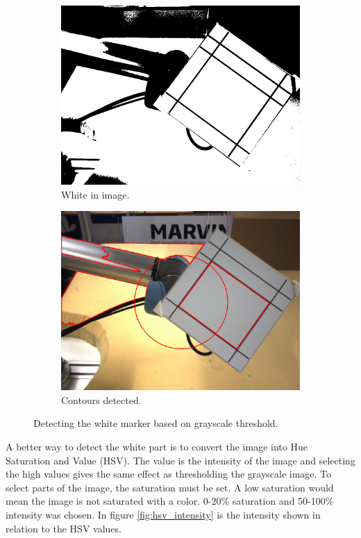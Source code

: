 \begin{figure}
 \centering
 \begin{subfigure}{0.49\linewidth}
 \includegraphics[width=\linewidth]{graphics/threshold_white}
 \caption{White in image.}
 \end{subfigure}
 \begin{subfigure}{0.49\linewidth}
 \includegraphics[width=\linewidth]{graphics/threshold_white_contours}
 \caption{Contours detected.}
 \end{subfigure}
 \caption{Detecting the white marker based on grayscale threshold.}
 \label{fig:threshold_marker1}
\end{figure}

A better way to detect the white part is to convert the image into Hue Saturation and Value (HSV).
The value is the intensity of the image and selecting the high values gives the same effect as thresholding the grayscale image.
To select parts of the image, the saturation must be set. A low saturation would mean the image is not saturated with a color.
0-20\% saturation and 50-100\% intensity was chosen.
In figure \ref{fig:hsv_intensity} is the intensity shown in relation to the HSV values.


